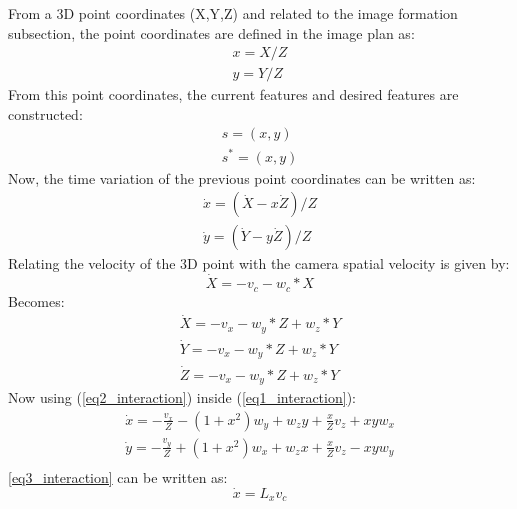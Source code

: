 From a 3D point coordinates (X,Y,Z) and related to the image formation subsection, the point coordinates are defined in the image plan as:
\begin{equation}
    \begin{aligned}
    x = X / Z \\
    y = Y / Z
    \end{aligned}
\end{equation}
From this point coordinates, the current features and desired features are constructed: 
\begin{equation}
    \begin{aligned}
     s = (x, y)\\
     s^* = (x, y) 
    \end{aligned}
\end{equation}
Now, the time variation of the previous point coordinates can be written as:
\begin{equation}
\label{eq1_interaction}
    \begin{aligned}
    \Dot{x} = (\Dot{X} - x\Dot{Z})/Z \\
    \Dot{y} = (\Dot{Y} - y\Dot{Z})/Z
    \end{aligned}
\end{equation}
Relating the velocity of the 3D point with the camera spatial velocity is given by:
 \begin{equation}
 \label{eq32_interaction}
    \Dot{X} = - v_c - w_c * X
 \end{equation}
Becomes:
\begin{equation}
\label{eq2_interaction}
    \begin{aligned}
    \Dot{X} = - v_x - w_y * Z + w_z*Y \\
    \Dot{Y} = - v_x - w_y * Z + w_z*Y \\
    \Dot{Z} = - v_x - w_y * Z + w_z*Y
\end{aligned}
\end{equation}
Now using (\ref{eq2_interaction}) inside (\ref{eq1_interaction}):
\begin{equation}
\label{eq3_interaction}
    \begin{aligned}
    \Dot{x} = - \frac{v_x}{Z} -(1+x^2)w_y + w_z y + \frac{x}{Z} v_z + x y w_x \\
    \Dot{y} =- \frac{v_y}{Z} + (1+x^2)w_x + w_z x + \frac{x}{Z} v_z - x y w_y \\
\end{aligned}
\end{equation}
\ref{eq3_interaction} can be written as:
\begin{equation}
    \Dot{x} = L_x v_c
\end{equation}
